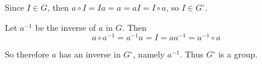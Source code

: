 \documentclass[12pt]{article}
\begin{document}
\begin{itemize}
Since $I \in G$, then $a \circ I = Ia = a = aI = I \circ a$, so $I \in G^\circ$.

Let $a^{-1}$ be the inverse of $a$ in $G$. Then
$$a \circ a^{-1} = a^{-1}a = I = aa^{-1} = a^{-1} \circ a$$

So therefore $a$ has an inverse in $G^\circ$, namely $a^{-1}$. Thus $G^\circ$ is a group.
\end{itemize}
\end{document}
